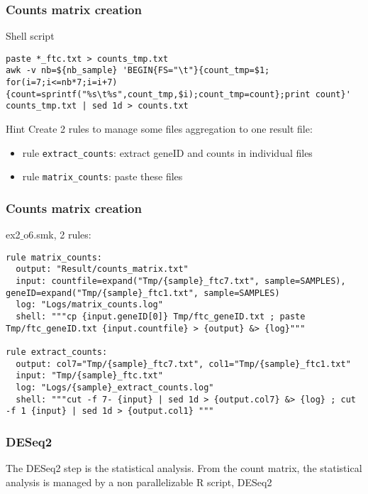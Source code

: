 \begin{frame}[containsverbatim]
\frametitle{Counts matrix creation}
\begin{exampleblock}{Shell script}
\begin{lstlisting}
paste *_ftc.txt > counts_tmp.txt
awk -v nb=${nb_sample} 'BEGIN{FS="\t"}{count_tmp=$1; for(i=7;i<=nb*7;i=i+7){count=sprintf("%s\t%s",count_tmp,$i);count_tmp=count};print count}' counts_tmp.txt | sed 1d > counts.txt
\end{lstlisting}
\end{exampleblock}
\begin{exampleblock}{Hint}
Create 2 rules to manage some files aggregation to one result file:
\begin{itemize}
    \item rule \verb|extract_counts|: extract geneID and counts in individual files
    \item rule \verb|matrix_counts|: paste these files
\end{itemize} 
\end{exampleblock}
\end{frame}
\begin{frame}[containsverbatim]
\frametitle{Counts matrix creation}
\begin{exampleblock}{ex2$\_$o6.smk, 2 rules:}
\begin{lstlisting}
rule matrix_counts:
  output: "Result/counts_matrix.txt"
  input: countfile=expand("Tmp/{sample}_ftc7.txt", sample=SAMPLES), geneID=expand("Tmp/{sample}_ftc1.txt", sample=SAMPLES)
  log: "Logs/matrix_counts.log"
  shell: """cp {input.geneID[0]} Tmp/ftc_geneID.txt ; paste Tmp/ftc_geneID.txt {input.countfile} > {output} &> {log}"""

rule extract_counts:
  output: col7="Tmp/{sample}_ftc7.txt", col1="Tmp/{sample}_ftc1.txt"
  input: "Tmp/{sample}_ftc.txt"
  log: "Logs/{sample}_extract_counts.log"
  shell: """cut -f 7- {input} | sed 1d > {output.col7} &> {log} ; cut -f 1 {input} | sed 1d > {output.col1} """
\end{lstlisting}
\end{exampleblock}
\end{frame}
\begin{frame}[containsverbatim]
\frametitle{DESeq2}
The DESeq2 step is the statistical analysis. From the count matrix, the statistical analysis is managed by a non parallelizable R script, DESeq2
\end{frame}
